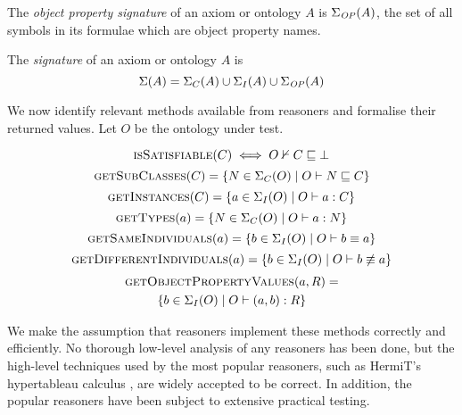 \documentclass[paper.tex]{subfiles}
\begin{document}
\begin{definition}
  The \emph{object property signature} of an axiom or ontology $A$ is $\Sigma_\mathit{OP}(A)$, the set of all symbols in its formulae which are object property names.
\end{definition}

\begin{definition}
  The \emph{signature} of an axiom or ontology $A$ is
  \[ \Sigma(A) = \Sigma_C(A) \cup \Sigma_I(A) \cup \Sigma_\mathit{OP}(A) \]
\end{definition}

We now identify relevant methods available from reasoners and formalise their returned values.  Let $O$ be the ontology under test.

\[ \Call{isSatisfiable}{C} \iff O \nsementails C \sqsubseteq \bot \]
\[ \Call{getSubClasses}{C} = \{ N \in \signatureC(O) \mid O \sementails N \sqsubseteq C \} \]
\[ \Call{getInstances}{C} = \{ a \in \signatureI(O) \mid O \sementails a : C \} \]
\[ \Call{getTypes}{a} = \{ N \in \signatureC(O) \mid O \sementails a : N \} \]
\[ \Call{getSameIndividuals}{a} = \{ b \in \signatureI(O) \mid O \sementails b \equiv a \} \]
\[ \Call{getDifferentIndividuals}{a} = \{ b \in \signatureI(O) \mid O \sementails b \not\equiv a \} \]
\begin{multline*}
  \Call{getObjectPropertyValues}{a, R} = \\
  \{ b \in \signatureI(O) \mid O \sementails (a, b) : R \}
\end{multline*}


We make the assumption that reasoners implement these methods correctly and efficiently.  No thorough low-level analysis of any reasoners has been done, but the high-level techniques used by the most popular reasoners, such as HermiT's hypertableau calculus \cite{Glimm:HermiT}, are widely accepted to be correct.  In addition, the popular reasoners have been subject to extensive practical testing.
\end{document}
